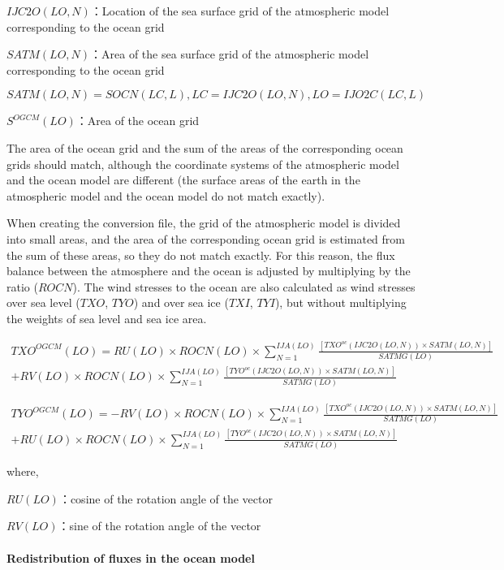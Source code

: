\(IJC2O(LO,N)\)：Location of the sea surface grid of the atmospheric
model corresponding to the ocean grid

\(SATM(LO,N)\)：Area of the sea surface grid of the atmospheric model
corresponding to the ocean grid

\(SATM(LO,N)=SOCN(LC,L),LC=IJC2O(LO,N),LO=IJO2C(LC,L)\)

\(S^{OGCM}(LO)\)：Area of the ocean grid

The area of the ocean grid and the sum of the areas of the corresponding
ocean grids should match, although the coordinate systems of the
atmospheric model and the ocean model are different (the surface areas
of the earth in the atmospheric model and the ocean model do not match
exactly).

When creating the conversion file, the grid of the atmospheric model is
divided into small areas, and the area of the corresponding ocean grid
is estimated from the sum of these areas, so they do not match exactly.
For this reason, the flux balance between the atmosphere and the ocean
is adjusted by multiplying by the ratio (\(ROCN\)). The wind stresses to
the ocean are also calculated as wind stresses over sea level (\(TXO\),
\(TYO\)) and over sea ice (\(TXI\), \(TYI\)), but without multiplying
the weights of sea level and sea ice area.

\begin{eqnarray} TXO^{OGCM}(LO)=RU(LO) \times ROCN(LO) \times \sum_{N=1}^{IJA(LO)} \frac{[TXO^{oc}(IJC2O(LO,N)) \times SATM(LO,N)]}{SATMG(LO)} \\ + RV(LO) \times ROCN(LO) \times \sum_{N=1}^{IJA(LO)}\frac{[TYO^{oc}(IJC2O(LO,N)) \times SATM(LO,N)]}{SATMG(LO)} \end{eqnarray}

\begin{eqnarray} TYO^{OGCM}(LO)=-RV(LO) \times ROCN(LO) \times \sum_{N=1}^{IJA(LO)} \frac{[TXO^{oc}(IJC2O(LO,N)) \times SATM(LO,N)]}{SATMG(LO)} \\ + RU(LO) \times ROCN(LO) \times \sum_{N=1}^{IJA(LO)}\frac{[TYO^{oc}(IJC2O(LO,N)) \times SATM(LO,N)]}{SATMG(LO)} \end{eqnarray}

where,

\(RU(LO)\)：cosine of the rotation angle of the vector

\(RV(LO)\)：sine of the rotation angle of the vector

\hypertarget{redistribution-of-fluxes-in-the-ocean-model}{%
\paragraph{Redistribution of fluxes in the ocean
model}\label{redistribution-of-fluxes-in-the-ocean-model}}

